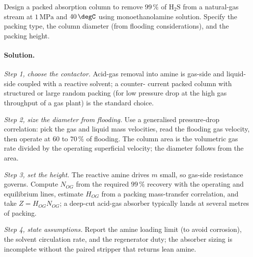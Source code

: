 \begin{exercise}
Design a packed absorption column to remove $99\,\%$ of $\text{H}_2
\text{S}$ from a natural-gas stream at $1\,\text{MPa}$ and $40\,\degC$
using monoethanolamine solution. Specify the packing type, the
column diameter (from flooding considerations), and the packing
height.

\paragraph{Solution.}
\textit{Step 1, choose the contactor.} Acid-gas removal into amine is
gas-side and liquid-side coupled with a reactive solvent; a counter-
current packed column with structured or large random packing (for low
pressure drop at the high gas throughput of a gas plant) is the
standard choice.

\textit{Step 2, size the diameter from flooding.} Use a generalised
pressure-drop correlation: pick the gas and liquid mass velocities,
read the flooding gas velocity, then operate at $60$ to $70\,\%$ of
flooding. The column area is the volumetric gas rate divided by the
operating superficial velocity; the diameter follows from the area.

\textit{Step 3, set the height.} The reactive amine drives $m$ small,
so gas-side resistance governs. Compute $N_{OG}$ from the required
$99\,\%$ recovery with the operating and equilibrium lines, estimate
$H_{OG}$ from a packing mass-transfer correlation, and take $Z =
H_{OG}N_{OG}$; a deep-cut acid-gas absorber typically lands at several
metres of packing.

\textit{Step 4, state assumptions.} Report the amine loading limit
(to avoid corrosion), the solvent circulation rate, and the regenerator
duty; the absorber sizing is incomplete without the paired stripper
that returns lean amine.
\end{exercise}


